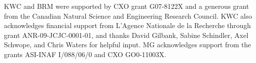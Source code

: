 \documentclass[11pt, preprint]{aastex}
\begin{document}
\acknowledgements

KWC and BRM were supported by CXO grant G07-8122X and a generous grant
from the Canadian Natural Science and Engineering Research
Council. KWC also acknowledges financial support from L'Agence
Nationale de la Recherche through grant ANR-09-JCJC-0001-01, and
thanks David Gilbank, Sabine Schindler, Axel Schwope, and Chris Waters
for helpful input. MG acknowledges support from the grants ASI-INAF
I/088/06/0 and CXO GO0-11003X.





\clearpage






\end{document}
